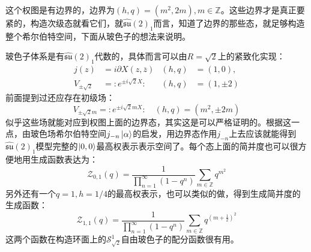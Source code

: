 这个权图是有边界的，边界为$(h,q)=(m^2,2m),m\in\mathbb{Z}$。这些边界才是真正要紧的，构造次级态就看它们，就$\widehat{\mathfrak{su}}(2)_1$而言，知道了边界的那些态，就足够构造整个希尔伯特空间，下面从玻色子的想法来说明。

玻色子体系是有$\widehat{\mathfrak{su}}(2)_1$代数的，具体而言可以由$R=\sqrt{2}$上的紧致化实现：
\begin{equation}
	\begin{aligned}j(z)&=i\partial X(z,\overline{z})&\left(h,q\right)&=\left(1,0\right),\\V_{\pm\sqrt{2}}&=:e^{\pm i\sqrt{2}X}:&\left(h,q\right)&=\left(1,\pm2\right)\end{aligned}
\end{equation}
前面提到过还应存在初级场：
\begin{equation}
	V_{\pm\sqrt{2}m}=:e^{\pm i\sqrt{2}mX}:\quad (h,q)=(m^2,\pm 2m)
\end{equation}
似乎这些场就能对应到权图上面的边界态，其实这是可以严格证明的。根据这一点，由玻色场希尔伯特空间$j_{-n}\ket{\alpha}$的启发，用边界态作用$j_{-n}$上去应该就能得到$\widehat{\mathfrak{su}}(2)_1$模型完整的$\ket{0,0}$最高权表示表示空间了。每个态上面的简并度也可以很方便地用生成函数表达为：
\begin{equation}
	\boxed{
		\mathcal{Z}_{0,1}(q)=\frac1{\prod_{n=1}^\infty\left(1-q^n\right)}\sum_{m\in\mathbb{Z}}q^{m^2}
	}
\end{equation}
另外还有一个$q=1,h=1/4$的最高权表示，也可以类似的做，得到生成简并度的生成函数：
\begin{equation}
	\boxed{
		\mathcal{Z}_{1,1}(q)=\frac1{\prod_{n=1}^\infty\left(1-q^n\right)}\sum_{m\in\mathbb{Z}}q^{(m+\frac 1{2})^2}
	}
\end{equation}
这两个函数在构造环面上的$\mathcal{S}^1_{\sqrt{2}}$自由玻色子的配分函数很有用。
